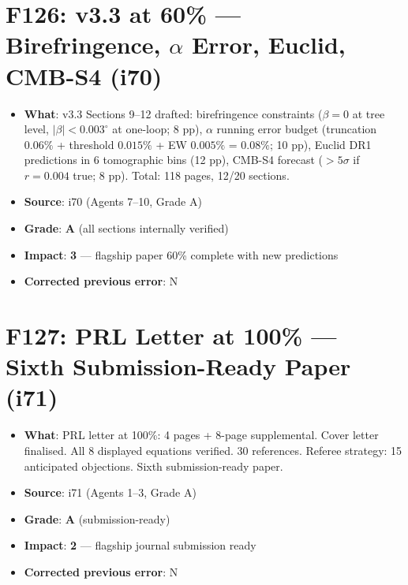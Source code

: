 \documentclass[11pt,a4paper]{article}
\newcommand{\grade}[1]{\textbf{#1}}
\newcommand{\impact}[1]{\textbf{#1}}
\begin{document}
\section{F126: v3.3 at 60\% --- Birefringence, $\alpha$ Error, Euclid, CMB-S4 (i70)}
\begin{itemize}[nosep]
\item \textbf{What}: v3.3 Sections 9--12 drafted: birefringence constraints ($\beta = 0$ at tree level, $|\beta| < 0.003^\circ$ at one-loop; 8 pp), $\alpha$ running error budget (truncation $0.06\%$ + threshold $0.015\%$ + EW $0.005\%$ = $0.08\%$; 10 pp), Euclid DR1 predictions in 6 tomographic bins (12 pp), CMB-S4 forecast ($>5\sigma$ if $r = 0.004$ true; 8 pp). Total: 118 pages, 12/20 sections.
\item \textbf{Source}: i70 (Agents 7--10, Grade A)
\item \textbf{Grade}: \grade{A} (all sections internally verified)
\item \textbf{Impact}: \impact{3} --- flagship paper 60\% complete with new predictions
\item \textbf{Corrected previous error}: N
\end{itemize}

\section{F127: PRL Letter at 100\% --- Sixth Submission-Ready Paper (i71)}
\begin{itemize}[nosep]
\item \textbf{What}: PRL letter at 100\%: 4 pages + 8-page supplemental. Cover letter finalised. All 8 displayed equations verified. 30 references. Referee strategy: 15 anticipated objections. Sixth submission-ready paper.
\item \textbf{Source}: i71 (Agents 1--3, Grade A)
\item \textbf{Grade}: \grade{A} (submission-ready)
\item \textbf{Impact}: \impact{2} --- flagship journal submission ready
\item \textbf{Corrected previous error}: N
\end{itemize}

\end{document}
